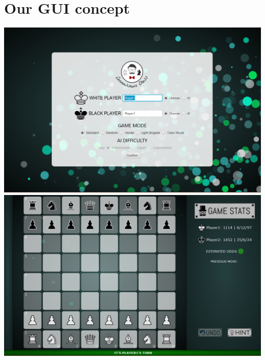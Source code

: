 \documentclass{article}
\begin{document}
    \section{Our GUI concept}
    \begin{center}
	\includegraphics[scale=0.5]{gui_menu}        
	\includegraphics[scale=0.5]{mockup_chess.png}


\end{center}
\end{document}
